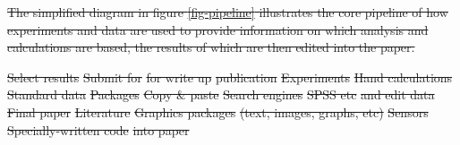 \documentclass{comjnl}
\providecommand{\DIFdel}[1]{{\protect\color{red}\sout{#1}}}                      %
\providecommand{\DIFdelFL}[1]{\DIFdel{#1}} %
\begin{document}
\DIFdel{The simplified diagram in figure \ref{fig-pipeline} illustrates the core pipeline of how experiments and data are used to provide information on which analysis and calculations are based, the results of which are then edited into the paper.
}%

\DIFdelFL{\lowarrow{\drop{$\rightarrow$}}
}%

\DIFdelFL{\lowarrow}%
\DIFdelFL{\lowarrow}%
\DIFdelFL{Select results}%
\DIFdelFL{\lowarrow}%
\DIFdelFL{Submit for}%
\DIFdelFL{for write up }%
\DIFdelFL{publication }%
\DIFdelFL{Experiments}%
\DIFdelFL{Hand calculations }%
\DIFdelFL{Standard data }%
\DIFdelFL{Packages  }%
\DIFdelFL{Copy \& paste }%
\DIFdelFL{Search engines}%
\DIFdelFL{SPSS etc }%
\DIFdelFL{and edit data }%
\DIFdelFL{Final paper}%
\DIFdelFL{Literature }%
\DIFdelFL{Graphics packages  }%
\DIFdelFL{(text, images, graphs, etc)}%
\DIFdelFL{Sensors }%
\DIFdelFL{Specially-written code }%
\DIFdelFL{into paper }%
\end{document}

